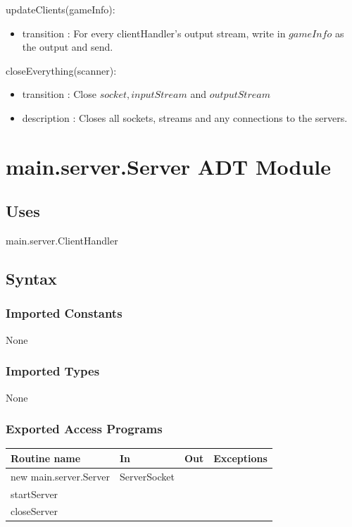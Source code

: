 \documentclass[12pt, titlepage]{article}
\begin{document}
        \noindent updateClients(gameInfo):
        \begin{itemize}
        \item transition : For every clientHandler's output stream, write in $gameInfo$ as the output and send.
        \end{itemize}
        
        \noindent closeEverything(scanner):
        \begin{itemize}
        \item transition : Close $socket, inputStream$ and $outputStream$
        \item description : Closes all sockets,  streams and any connections to the servers.
        \end{itemize}
        
        
                        
        
\section* {main.server.Server ADT Module}
    \subsection* {Uses}
    main.server.ClientHandler
    \subsection* {Syntax}
    
        \subsubsection* {Imported Constants}
            None
        \subsubsection* {Imported Types}
            None
        \subsubsection* {Exported Access Programs}
        
        \begin{tabular}{| l | l | l | p{6cm} |}
            \hline
            \textbf{Routine name} & \textbf{In} & \textbf{Out} & \textbf{Exceptions}\\
            \hline
            new main.server.Server & ServerSocket &  & \\
            \hline
            startServer &  &  & \\
            \hline 
            closeServer &  &  &\\
            \hline 
        \end{tabular}
        
\end{document}
